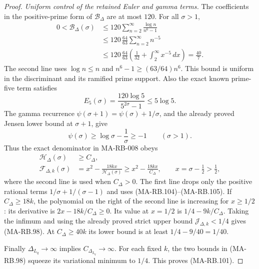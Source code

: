 \begin{proof}
\emph{Uniform control of the retained Euler and gamma terms.}
The coefficients in the positive-prime form of
\(\mathcal B_\Delta\) are at most \(120\).
For all \(\sigma>1\),
\[
 \begin{split}
 0<\mathcal B_\Delta(\sigma)
 &\le120\sum_{n=2}^{\infty}\frac{\log n}{n^6-1}\\
 &\le120\,\frac{64}{63}\sum_{n=2}^{\infty}n^{-5}\\
 &\le120\,\frac{64}{63}
             \left(\frac1{32}+\int_2^\infty x^{-5}\,dx\right)
   =\frac{40}{7}.
 \end{split}
 \tag{MA-RB.104}
\]
The second line uses \(\log n\le n\) and
\(n^6-1\ge(63/64)n^6\).
This bound is uniform in the discriminant and its
ramified prime support. Also the exact known
prime-five term satisfies
\[
          E_5(\sigma)=\frac{120\log5}{5^{2\sigma}-1}
                                    \le5\log5.
\]
The gamma recurrence
\(\psi(\sigma+1)=\psi(\sigma)+1/\sigma\),
and the already proved Jensen lower bound at
\(\sigma+1\), give
\[
 \psi(\sigma)
     \ge\log\sigma-\frac1\sigma\ge-1
                                    \qquad(\sigma>1).
 \tag{MA-RB.105}
\]
Thus the exact denominator in MA-RB-008 obeys
\[
 \begin{aligned}
 \mathcal H_\Delta(\sigma)&\ge C_\Delta,\\
 \mathcal F_{\Delta,k}(\sigma)
   &=x^2-\frac{18kx}{\mathcal H_\Delta(\sigma)}
      \ge x^2-\frac{18kx}{C_\Delta},
          \qquad x=\sigma-\tfrac12>\tfrac12,
 \end{aligned}
 \tag{MA-RB.106}
\]
where the second line is used when \(C_\Delta>0\).
The first line drops only the positive rational
terms \(1/\sigma+1/(\sigma-1)\) and uses
(MA-RB.104)--(MA-RB.105).
If \(C_\Delta\ge18k\), the polynomial on the right
of the second line is increasing for \(x\ge1/2\):
its derivative is \(2x-18k/C_\Delta\ge0\).
Its value at \(x=1/2\) is \(1/4-9k/C_\Delta\).
Taking the infimum and using the already proved
strict upper bound \(\mathcal J_{\Delta,k}<1/4\)
gives (MA-RB.98). At \(C_\Delta\ge40k\) its lower
bound is at least \(1/4-9/40=1/40\).

Finally \(\Delta_{L_q}\to\infty\) implies
\(C_{\Delta_{L_q}}\to\infty\).
For each fixed \(k\), the two bounds in
(MA-RB.98) squeeze its variational minimum
to \(1/4\). This proves (MA-RB.101).
\end{proof}

